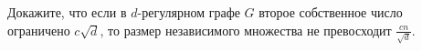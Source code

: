 Докажите, что если в $d$-регулярном графе $G$ второе собственное число ограничено $c \sqrt{d}$, то размер независимого
множества не превосходит $\frac{cn}{\sqrt{d}}$.
